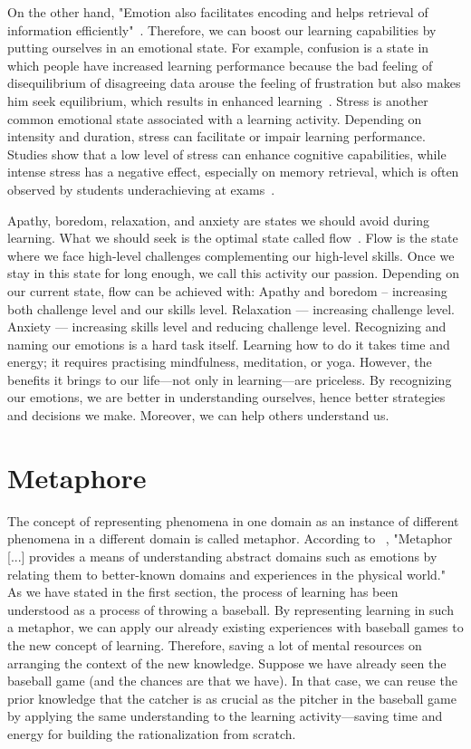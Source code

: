 \documentclass{article}
\begin{document}
On the other hand, "Emotion also facilitates encoding and helps retrieval of information efficiently"~\cite{tyng2017influences}. Therefore, we can boost our learning capabilities by putting ourselves in an emotional state. For example, confusion is a state in which people have increased learning performance because the bad feeling of disequilibrium of disagreeing data arouse the feeling of frustration but also makes him seek equilibrium, which results in enhanced learning~\cite{d2014confusion}. Stress is another common emotional state associated with a learning activity. Depending on intensity and duration, stress can facilitate or impair learning performance. Studies show that a low level of stress can enhance cognitive capabilities, while intense stress has a negative effect, especially on memory retrieval, which is often observed by students underachieving at exams~\cite{vogel2016learning}. 

Apathy, boredom, relaxation, and anxiety are states we should avoid during learning. What we should seek is the optimal state called flow~\cite{csikszentmihalyi1990flow}. Flow is the state where we face high-level challenges complementing our high-level skills. Once we stay in this state for long enough, we call this activity our passion.  Depending on our current state, flow can be achieved with:
Apathy and boredom – increasing both challenge level and our skills level.
Relaxation — increasing challenge level.
Anxiety — increasing skills level and reducing challenge level.
Recognizing and naming our emotions is a hard task itself. Learning how to do it takes time and energy; it requires practising mindfulness, meditation, or yoga. However, the benefits it brings to our life—not only in learning—are priceless. By recognizing our emotions, we are better in understanding ourselves, hence better strategies and decisions we make. Moreover, we can help others understand us.

\section{Metaphore}
The concept of representing phenomena in one domain as an instance of different phenomena in a different domain is called metaphor. 
According to ~\cite{radden2007cognitive},  "Metaphor [...] provides a means of understanding abstract domains such as emotions by relating them to better-known domains and experiences in the physical world."
As we have stated in the first section, the process of learning has been understood as a process of throwing a baseball. By representing learning in such a metaphor, we can apply our already existing experiences with baseball games to the new concept of learning. Therefore, saving a lot of mental resources on arranging the context of the new knowledge. Suppose we have already seen the baseball game (and the chances are that we have). In that case, we can reuse the prior knowledge that the catcher is as crucial as the pitcher in the baseball game by applying the same understanding to the learning activity—saving time and energy for building the rationalization from scratch.
\end{document}
